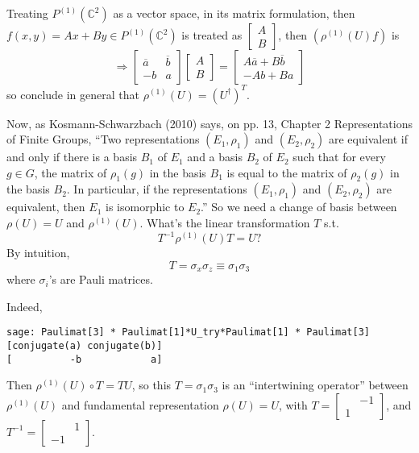 \documentclass[10pt]{amsart}
\begin{document}
\begin{multicols*}{2}
Treating $P^{(1)}(\mathbb{C}^2)$ as a vector space, in its matrix formulation, then $f(x,y) = Ax+By \in P^{(1)}(\mathbb{C}^2)$ is treated as $\left[ \begin{matrix} A \\ B \end{matrix} \right]$, then $(\rho^{(1)}(U)f)$ is 
\[
\Longrightarrow \left[ \begin{matrix} \overline{a} & \overline{b} \\ -b & a \end{matrix} \right]\left[ \begin{matrix} A \\ B \end{matrix} \right] = \left[ \begin{matrix} A\overline{a} + B\overline{b}  \\ -Ab + Ba \end{matrix} \right]
\]
so conclude in general that $\rho^{(1)}(U) = (U^{\dag})^T$.  

Now, as Kosmann-Schwarzbach (2010) \cite{YKosmann-Schwarzbach2010} says, on pp. 13, Chapter 2 Representations of Finite Groups, ``Two representations $(E_1,\rho_1)$ and $(E_2,\rho_2)$ are equivalent if and only if there is a basis $B_1$ of $E_1$ and a basis $B_2$ of $E_2$ such that for every $g\in G$, the matrix of $\rho_1(g)$ in the basis $B_1$ is equal to the matrix of $\rho_2(g)$ in the basis $B_2$.  In particular, if the representations $(E_1,\rho_1)$ and $(E_2,\rho_2)$ are equivalent, then $E_1$ is isomorphic to $E_2$.''  So we need a change of basis between $\rho(U) = U$ and $\rho^{(1)}(U)$.  What's the linear transformation $T$ s.t.
\[
T^{-1} \rho^{(1)}(U) T = U ?
\]  
By intuition, 
\[
T = \sigma_x \sigma_z \equiv \sigma_1 \sigma_3
\]
where $\sigma_i$'s are Pauli matrices.  

Indeed, 
\begin{lstlisting}
sage: Paulimat[3] * Paulimat[1]*U_try*Paulimat[1] * Paulimat[3]
[conjugate(a) conjugate(b)]
[          -b            a]
\end{lstlisting}

Then $\rho^{(1)}(U)\circ T = TU$, so this $T = \sigma_1 \sigma_3$ is an ``intertwining operator'' between $\rho^{(1)}(U)$ and fundamental representation $\rho(U) = U$, with $T = \left[ \begin{matrix} & - 1 \\
    1 & \end{matrix} \right]$, and $T^{-1} = \left[ \begin{matrix} & 1 \\ -1 & \end{matrix} \right]$.  


\end{multicols*}
\end{document}
